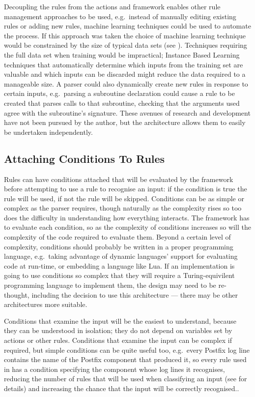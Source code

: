 Decoupling the rules from the actions and framework enables other rule
management approaches to be used, e.g.\ instead of manually editing
existing rules or adding new rules, machine learning techniques could be
used to automate the process.  If this approach was taken the choice of
machine learning technique would be constrained by the size of typical data
sets (see ).  Techniques requiring the full
data set when training would be impractical; Instance Based
Learning~\cite{instance-based-learning} techniques that automatically
determine which inputs from the training set are valuable and which inputs
can be discarded might reduce the data required to a manageable size.  A
parser could also dynamically create new rules in response to certain
inputs, e.g.\ parsing a subroutine declaration could cause a rule to be
created that parses calls to that subroutine, checking that the arguments
used agree with the subroutine's signature.  These avenues of research and
development have not been pursued by the author, but the architecture
allows them to easily be undertaken independently.

\subsection{Attaching Conditions To Rules}

\label{attaching conditions to rules}

Rules can have conditions attached that will be evaluated by the framework
before attempting to use a rule to recognise an input: if the condition is
true the rule will be used, if not the rule will be skipped.  Conditions
can be as simple or complex as the parser requires, though naturally as the
complexity rises so too does the difficulty in understanding how everything
interacts.  The framework has to evaluate each condition, so as the
complexity of conditions increases so will the complexity of the code
required to evaluate them.  Beyond a certain level of complexity,
conditions should probably be written in a proper programming language,
e.g.\ taking advantage of dynamic languages' support for evaluating code at
run-time, or embedding a language like Lua.  If an implementation is going
to use conditions so complex that they will require a Turing-equivilent
programming language to implement them, the design may need to be
re-thought, including the decision to use this architecture --- there may
be other architectures more suitable.

Conditions that examine the input will be the easiest to understand,
because they can be understood in isolation; they do not depend on
variables set by actions or other rules.  Conditions that examine the input
can be complex if required, but simple conditions can be quite useful too,
e.g.\ every Postfix log \empty{}line contains the name of the Postfix
component that produced it, so every rule used in \parsername{} has a
condition specifying the component whose log \empty{}lines it recognises,
reducing the number of rules that will be used when classifying an input
(see  for details) and increasing the
chance that the input will be correctly recognised..

